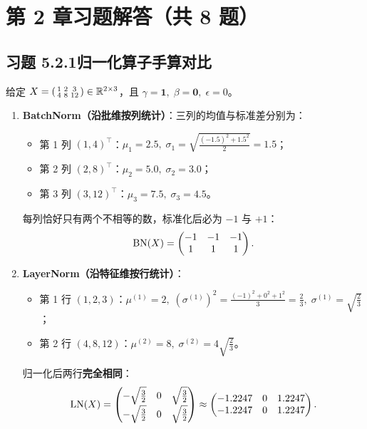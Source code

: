 \section*{第 2 章习题解答（共 8 题）}

\subsection*{习题 5.2.1\quad 归一化算子手算对比}
给定 $X = \begin{psmallmatrix} 1 & 2 & 3 \\ 4 & 8 & 12 \end{psmallmatrix} \in \mathbb{R}^{2\times 3}$，且 $\gamma = \mathbf{1},\; \beta = \mathbf{0},\; \epsilon = 0$。
\begin{enumerate}[label=(\arabic*), leftmargin=1.8em]
  \item \textbf{BatchNorm（沿批维按列统计）}：三列的均值与标准差分别为：
  \begin{itemize}
    \item 第 1 列 $(1, 4)^\top$：$\mu_1 = 2.5,\; \sigma_1 = \sqrt{\frac{(-1.5)^2 + 1.5^2}{2}} = 1.5$；
    \item 第 2 列 $(2, 8)^\top$：$\mu_2 = 5.0,\; \sigma_2 = 3.0$；
    \item 第 3 列 $(3, 12)^\top$：$\mu_3 = 7.5,\; \sigma_3 = 4.5$。
  \end{itemize}
  每列恰好只有两个不相等的数，标准化后必为 $-1$ 与 $+1$：
  \[
    \operatorname{BN}(X) = \begin{pmatrix} -1 & -1 & -1 \\ 1 & 1 & 1 \end{pmatrix}.
  \]

  \item \textbf{LayerNorm（沿特征维按行统计）}：
  \begin{itemize}
    \item 第 1 行 $(1, 2, 3)$：$\mu^{(1)} = 2,\; (\sigma^{(1)})^2 = \frac{(-1)^2 + 0^2 + 1^2}{3} = \frac{2}{3},\; \sigma^{(1)} = \sqrt{\frac{2}{3}}$；
    \item 第 2 行 $(4, 8, 12)$：$\mu^{(2)} = 8,\; \sigma^{(2)} = 4\sqrt{\frac{2}{3}}$。
  \end{itemize}
  归一化后两行\textbf{完全相同}：
  \[
    \operatorname{LN}(X) = \begin{pmatrix}
      -\sqrt{\tfrac{3}{2}} & 0 & \sqrt{\tfrac{3}{2}} \\[3pt]
      -\sqrt{\tfrac{3}{2}} & 0 & \sqrt{\tfrac{3}{2}}
    \end{pmatrix}
    \approx \begin{pmatrix}
      -1.2247 & 0 & 1.2247 \\
      -1.2247 & 0 & 1.2247
    \end{pmatrix}.
  \]


\end{enumerate}

